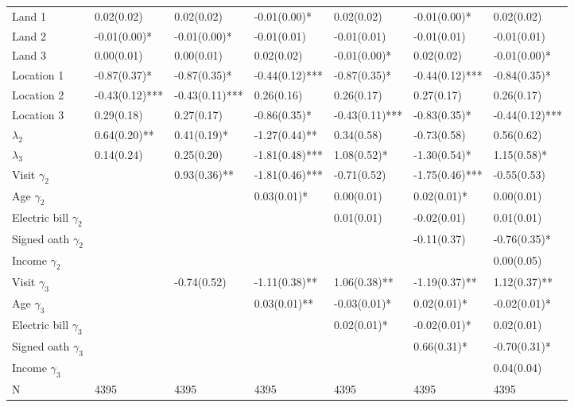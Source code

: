 \begin{tabular}{lllllll}
  Land 1 &  0.02(0.02)    &  0.02(0.02)    & -0.01(0.00)*   &  0.02(0.02)    & -0.01(0.00)*   &  0.02(0.02)    \\ 
  Land 2 & -0.01(0.00)*   & -0.01(0.00)*   & -0.01(0.01)    & -0.01(0.01)    & -0.01(0.01)    & -0.01(0.01)    \\ 
  Land 3 &  0.00(0.01)    &  0.00(0.01)    &  0.02(0.02)    & -0.01(0.00)*   &  0.02(0.02)    & -0.01(0.00)*   \\ 
  Location 1 & -0.87(0.37)*   & -0.87(0.35)*   & -0.44(0.12)*** & -0.87(0.35)*   & -0.44(0.12)*** & -0.84(0.35)*   \\ 
  Location 2 & -0.43(0.12)*** & -0.43(0.11)*** &  0.26(0.16)    &  0.26(0.17)    &  0.27(0.17)    &  0.26(0.17)    \\ 
  Location 3 &  0.29(0.18)    &  0.27(0.17)    & -0.86(0.35)*   & -0.43(0.11)*** & -0.83(0.35)*   & -0.44(0.12)*** \\ 
  $\lambda_{2}$ &  0.64(0.20)**  &  0.41(0.19)*   & -1.27(0.44)**  &  0.34(0.58)    & -0.73(0.58)    &  0.56(0.62)    \\ 
  $\lambda_{3}$ &  0.14(0.24)    &  0.25(0.20)    & -1.81(0.48)*** &  1.08(0.52)*   & -1.30(0.54)*   &  1.15(0.58)*   \\ 
  Visit $\gamma_{2}$ &  &  0.93(0.36)**  & -1.81(0.46)*** & -0.71(0.52)    & -1.75(0.46)*** & -0.55(0.53)    \\ 
  Age $\gamma_{2}$ &  &  &  0.03(0.01)*   &  0.00(0.01)    &  0.02(0.01)*   &  0.00(0.01)    \\ 
  Electric bill $\gamma_{2}$ &  &  &  &  0.01(0.01)    & -0.02(0.01)    &  0.01(0.01)    \\ 
  Signed oath $\gamma_{2}$ &  &  &  &  & -0.11(0.37)    & -0.76(0.35)*   \\ 
  Income $\gamma_{2}$ &  &  &  &  &  &  0.00(0.05)    \\ 
  Visit $\gamma_{3}$ &  & -0.74(0.52)    & -1.11(0.38)**  &  1.06(0.38)**  & -1.19(0.37)**  &  1.12(0.37)**  \\ 
  Age $\gamma_{3}$ &  &  &  0.03(0.01)**  & -0.03(0.01)*   &  0.02(0.01)*   & -0.02(0.01)*   \\ 
  Electric bill $\gamma_{3}$ &  &  &  &  0.02(0.01)*   & -0.02(0.01)*   &  0.02(0.01)    \\ 
  Signed oath $\gamma_{3}$ &  &  &  &  &  0.66(0.31)*   & -0.70(0.31)*   \\ 
  Income $\gamma_{3}$ &  &  &  &  &  &  0.04(0.04)    \\ 
  N & 4395 & 4395 & 4395 & 4395 & 4395 & 4395 \\ 

\end{tabular}
